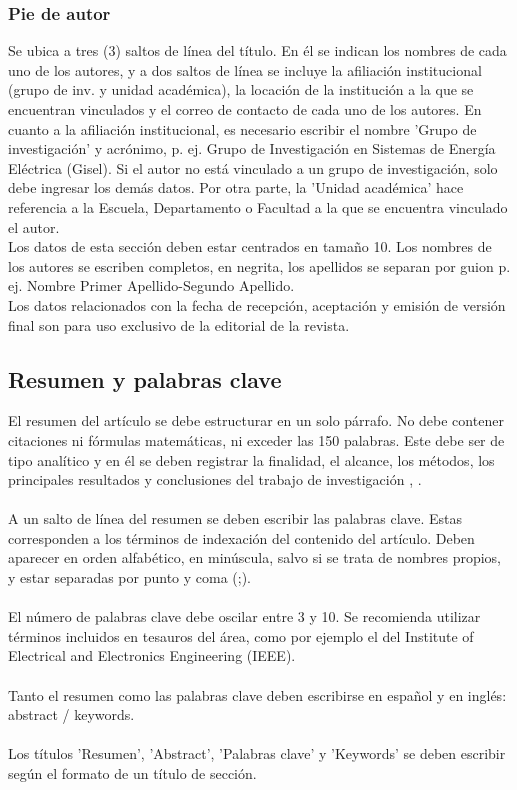 \documentclass[10pt,letterpaper,twoside,twocolumn]{article}   %
\begin{document}
\subsubsection{Pie de autor}
Se ubica a tres (3) saltos de línea del título. En él se indican los nombres de cada uno de los autores, y a dos saltos de línea se incluye la afiliación institucional (grupo de inv. y unidad académica), la locación de la institución a la que se encuentran vinculados y el correo de contacto de cada uno de los autores. En cuanto a la afiliación institucional, es necesario escribir el nombre 'Grupo de investigación' y acrónimo, p. ej.  Grupo de Investigación en Sistemas de Energía Eléctrica (Gisel). Si el autor no está vinculado a un grupo de investigación, solo debe ingresar los demás datos. Por otra parte, la 'Unidad académica' hace referencia a la Escuela, Departamento o Facultad a la que se encuentra vinculado el autor.\\
Los datos de esta sección deben estar centrados en tamaño 10. Los nombres de los autores se escriben completos, en negrita, los apellidos se separan por guion p. ej. Nombre Primer Apellido-Segundo Apellido. \\
Los datos relacionados con la fecha de recepción, aceptación y emisión de versión final son para uso exclusivo de la editorial de la revista.
\subsection{Resumen y palabras clave}
El resumen del artículo se debe estructurar en un solo párrafo. No debe contener citaciones ni fórmulas matemáticas, ni exceder las 150 palabras. Este debe ser de tipo analítico y en él se deben registrar la finalidad, el alcance, los métodos, los principales resultados y conclusiones del trabajo de investigación \cite{silva2010resumen}, \cite{diez2007resumen}.\\
\\
A un salto de línea del resumen se deben escribir las palabras clave. Estas corresponden a los términos de indexación del contenido del artículo. Deben aparecer en orden alfabético, en minúscula, salvo si se trata de nombres propios, y estar separadas por punto y coma (;).\\
\\
El número de palabras clave debe oscilar entre 3 y 10. Se recomienda utilizar términos incluidos en tesauros del área, como por ejemplo el del Institute of Electrical and Electronics Engineering (IEEE).\\
\\
Tanto el resumen como las palabras clave deben escribirse en español y en inglés: abstract / keywords.\\
\\
Los títulos 'Resumen', 'Abstract', 'Palabras clave' y 'Keywords' se deben escribir según el formato de un título de sección.
\end{document}
